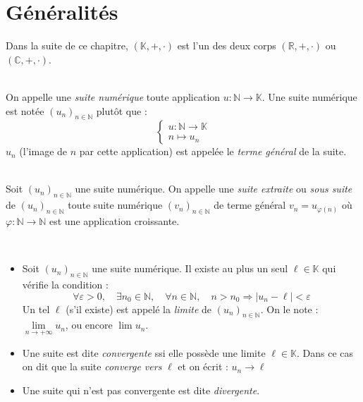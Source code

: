 \section{Généralités}
    Dans la suite de ce chapitre, \((\mathbb{K}, +, \cdot)\) est l'un des deux corps \((\mathbb{R}, +, \cdot)\) ou \((\mathbb{C}, +, \cdot)\).
    
    \begin{definition}
        \ \\
        On appelle une \emph{suite numérique} toute application \(u:\mathbb{N} \rightarrow \mathbb{K}\).
        Une suite numérique est notée \((u_n)_{n \in \mathbb{N}}\) plutôt que :
        \[
            \left\{
                \begin{array}{l}
                    u: \mathbb{N} \rightarrow \mathbb{K}\\
                    n \mapsto u_n
                \end{array}
            \right.    
        \]
        \(u_n\) (l'image de \(n\) par cette application) est appelée le \emph{terme général} de la suite.
    \end{definition}

    \begin{definition}
        \ \\
        Soit \((u_n)_{n\in\mathbb{N}}\) une suite numérique. On appelle une \emph{suite extraite} ou \emph{sous suite} de \((u_n)_{n\in\mathbb{N}}\) toute suite numérique \((v_n)_{n\in\mathbb{N}}\) de terme général \(v_n = u_{\varphi(n)}\) où \(\varphi: \mathbb{N} \rightarrow \mathbb{N}\) est une application croissante.
    \end{definition}
    
    \begin{thedef}
        \ \\
        \label{definition:limite_suite}
        \begin{itemize}
            \item Soit \((u_n)_{n\in\mathbb{N}}\) une suite numérique. Il existe au plus un seul \(\ell\in\mathbb{K}\) qui vérifie la condition :
            \[
                \forall \varepsilon > 0, \quad \exists n_0 \in \mathbb{N}, \quad \forall n \in \mathbb{N}, \quad n > n_0 \Rightarrow |u_n - \ell| < \varepsilon    
            \]
            Un tel \(\ell\) (s'il existe) est appelé la \emph{limite} de \((u_n)_{n\in\mathbb{N}}\). On le note :  \(\lim\limits_{n\to+\infty}u_n\), ou encore \(\lim u_n\).
            \item Une suite est dite \emph{convergente} ssi elle possède une limite \(\ell \in \mathbb{K}\). Dans ce cas on dit que la suite \emph{converge vers} \(\ell\) et on écrit : \(u_n \to\ell \)
            \item Une suite qui n'est pas convergente est dite \emph{divergente}.
        \end{itemize}
    \end{thedef}

